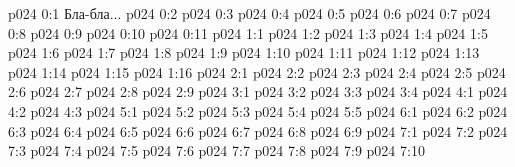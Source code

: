 \author{Божественный Советник}
\vs p024 0:1  Бла-бла...
\vs p024 0:2 \pc 
\vs p024 0:3 
\vs p024 0:4 
\vs p024 0:5 
\vs p024 0:6 
\vs p024 0:7 
\vs p024 0:8 
\vs p024 0:9 
\vs p024 0:10 \pc 
\vs p024 0:11 
\vs p024 1:1 
\vs p024 1:2 \pc 
\vs p024 1:3 
\vs p024 1:4 
\vs p024 1:5 
\vs p024 1:6 
\vs p024 1:7 \pc 
\vs p024 1:8 
\vs p024 1:9 
\vs p024 1:10 
\vs p024 1:11 
\vs p024 1:12 \pc 
\vs p024 1:13 \pc 
\vs p024 1:14 
\vs p024 1:15 \pc 
\vs p024 1:16 
\vs p024 2:1 
\vs p024 2:2 
\vs p024 2:3 \pc 
\vs p024 2:4 
\vs p024 2:5 
\vs p024 2:6 
\vs p024 2:7 \pc 
\vs p024 2:8 
\vs p024 2:9 
\vs p024 3:1 
\vs p024 3:2 
\vs p024 3:3 
\vs p024 3:4 
\vs p024 4:1 
\vs p024 4:2 
\vs p024 4:3 
\vs p024 5:1 
\vs p024 5:2 
\vs p024 5:3 
\vs p024 5:4 
\vs p024 5:5 \pc 
{}
\vs p024 6:1 
\vs p024 6:2 
\vs p024 6:3 
\vs p024 6:4 \pc 
\vs p024 6:5 
\vs p024 6:6 
\vs p024 6:7 
\vs p024 6:8 \pc 
\vs p024 6:9 \pc 
{}
\vs p024 7:1 
\vs p024 7:2 
\vs p024 7:3 
\vs p024 7:4 \pc 
\vs p024 7:5 
\vs p024 7:6 
\vs p024 7:7 \pc 
\vs p024 7:8 \pc 
\vs p024 7:9 
\vsetoff
\vs p024 7:10 
\quizlink
